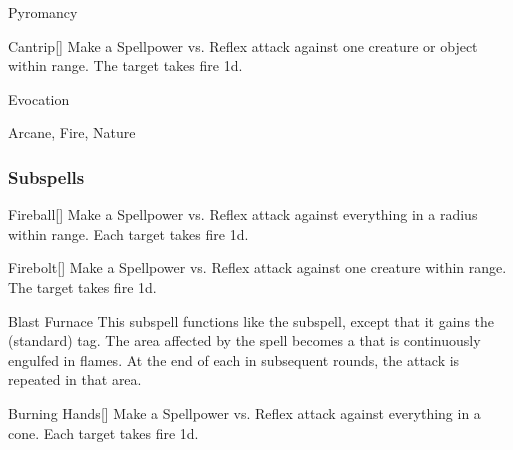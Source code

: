 \newpage
\begin{spellsection}{Pyromancy}

\begin{spellheader}
\end{spellheader}


\begin{ability}{Cantrip}[]
Make a Spellpower vs. Reflex attack against one creature or object within \rngmed range.
\hit The target takes fire  \minus1d.
\end{ability}




 Evocation

 Arcane, Fire, Nature
\end{spellsection}


\subsubsection{Subspells}


\begin{ability}[\nth{1}]{Fireball}[]
Make a Spellpower vs. Reflex attack against everything in a \areasmall radius within \rngclose range.
\hit Each target takes fire  \minus1d.
\end{ability}
\vspace{0.25em}


\begin{ability}[\nth{1}]{Firebolt}[]
Make a Spellpower vs. Reflex attack against one creature within \rngmed range.
\hit The target takes fire  \plus1d.
\end{ability}
\vspace{0.25em}


\begin{ability}[\nth{2}]{Blast Furnace}
This subspell functions like the  subspell, except that it gains the  (standard) tag.
The area affected by the spell becomes a  that is continuously engulfed in flames.
At the end of each  in subsequent rounds, the attack is repeated in that area.
\end{ability}
\vspace{0.25em}


\begin{ability}[\nth{2}]{Burning Hands}[]
Make a Spellpower vs. Reflex attack against everything in a \arealarge cone.
\hit Each target takes fire  \minus1d.
\end{ability}
\vspace{0.25em}


